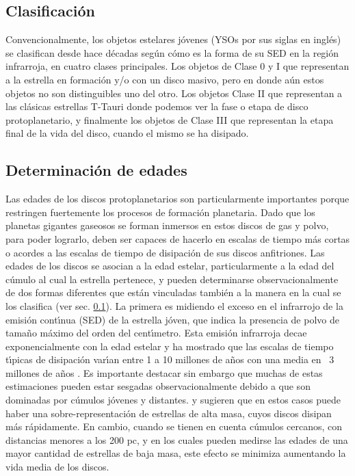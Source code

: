 \documentclass[baaa]{baaa}
\begin{document}
\subsection{Clasificaci\'on}\label{Clasificacion}

Convencionalmente, los objetos estelares j\'ovenes (YSOs por sus siglas en ingl\'es) se clasifican desde hace d\'ecadas seg\'un c\'omo es la forma de su SED en la regi\'on infrarroja, en cuatro clases principales. Los objetos de Clase 0 y I que representan a la estrella en formaci\'on y/o con un disco masivo, pero en donde aún estos objetos no son distinguibles uno del otro. Los objetos Clase II que representan a las cl\'asicas estrellas T-Tauri donde podemos ver la fase o etapa de disco protoplanetario, y finalmente los objetos de Clase III que representan la etapa final de la vida del disco, cuando el mismo se ha disipado.

\subsection{Determinaci\'on de edades}\label{Edades}

Las edades de los discos protoplanetarios son particularmente importantes porque restringen fuertemente los procesos de formaci\'on planetaria. Dado que los planetas gigantes gaseosos se forman inmersos en estos discos de gas y polvo, para poder lograrlo, deben ser capaces de hacerlo en escalas de tiempo m\'as cortas o acordes a las escalas de tiempo de disipaci\'on de sus discos anfitriones. 
Las edades de los discos se asocian a la edad estelar, particularmente a la edad del c\'umulo al cual la estrella pertenece, y pueden determinarse observacionalmente de dos formas diferentes que est\'an vinculadas tambi\'en a la manera en la cual se los clasifica (ver sec. \ref{Clasificacion}). La primera es midiendo el exceso en el infrarrojo de la emisi\'on cont\'{\i}nua (SED) de la estrella j\'oven, que indica la presencia de polvo de tama\~no m\'aximo del orden del cent\'{\i}metro. Esta emisi\'on infrarroja decae exponencialmente con la edad estelar y ha mostrado que las escalas de tiempo t\'{\i}picas de disipaci\'on var\'{\i}an entre 1 a 10 millones de a\~nos con una media en ~3 millones de a\~nos \citep{Mamajek2009,Ribas2015}. Es importante destacar sin embargo que muchas de estas estimaciones pueden estar sesgadas observacionalmente debido a que son dominadas por c\'umulos j\'ovenes y distantes. \citet{Pfalzner2014} y \citet{Pfalzner2022} sugieren que en estos casos puede haber una sobre-representaci\'on de estrellas de alta masa, cuyos discos disipan m\'as r\'apidamente. En cambio, cuando se tienen en cuenta c\'umulos cercanos, con distancias menores a los 200 pc, y en los cuales pueden medirse las edades de una mayor cantidad de estrellas de baja masa, este efecto se minimiza aumentando la vida media de los discos.
\end{document}
